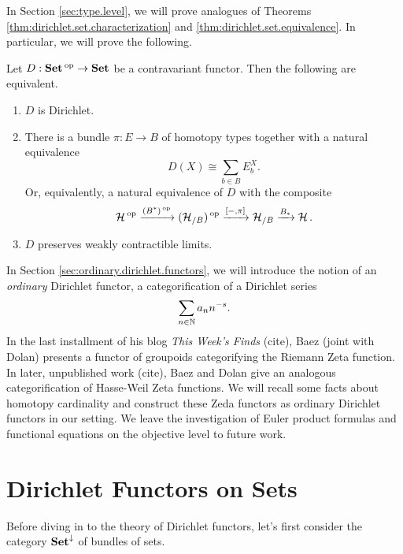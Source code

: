 In Section \ref{sec:type.level}, we will prove analogues of Theorems
\ref{thm:dirichlet.set.characterization} and
\ref{thm:dirichlet.set.equivalence}. In particular, we will prove the following.

\begin{thm}\label{thm:dirichlet.type.characterization}
Let $D : \operatorname{\textbf{Set}}\operatorname{^\text{op}} \to \operatorname{\textbf{Set}}$ be a contravariant functor. Then the following are
equivalent.
\begin{enumerate}
\item $D$ is Dirichlet.
\item There is a bundle $\pi : E \to B$ of homotopy types together with a natural equivalence
  $$D(X) \cong \sum_{b \in B} E_b^X.$$
  Or, equivalently, a natural equivalence of $D$ with the composite
  $$\operatorname{\mathcal{H}}\operatorname{^\text{op}} \xrightarrow{(B^{\ast})\operatorname{^\text{op}}} (\operatorname{\mathcal{H}}_{/B})\operatorname{^\text{op}} \xrightarrow{[-, \pi]} \operatorname{\mathcal{H}}_{/B}
  \xrightarrow{B_{\ast}} \operatorname{\mathcal{H}}.$$
\item $D$ preserves weakly contractible limits.
\end{enumerate}
\end{thm}

In Section \ref{sec:ordinary.dirichlet.functors}, we will introduce the notion
of an \emph{ordinary} Dirichlet functor, a categorification of a Dirichlet
series
$$\sum_{n \in \operatorname{\mathbb{N}}} a_n n^{-s}.$$
In the last installment of his blog \emph{This Week's Finds} (cite), Baez (joint with
Dolan) presents a functor of groupoids categorifying the Riemann Zeta function.
In later, unpublished work (cite), Baez and Dolan give an analogous
categorification of Hasse-Weil Zeta functions. We will recall some facts about
homotopy cardinality and construct these Zeda functors as ordinary Dirichlet
functors in our setting. We leave the investigation of Euler product formulas
and functional equations on the objective level to future work.

\begin{acknowledgements}

\end{acknowledgements}


\section{Dirichlet Functors on Sets} \label{sec:set.level}

Before diving in to the theory of Dirichlet functors, let's first consider the
category $\operatorname{\textbf{Set}}^{\downarrow}$ of bundles of sets.

